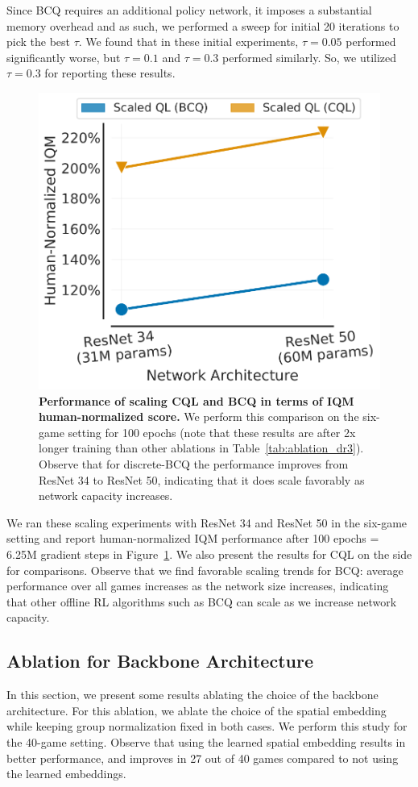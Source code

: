 {Since BCQ requires an additional policy network, it imposes a substantial memory overhead and as such, we performed a sweep for initial 20 iterations to pick the best $\tau$.
We found that in these initial experiments, $\tau=0.05$ performed significantly worse, but $\tau=0.1$ and $\tau=0.3$ performed similarly. So, we utilized $\tau=0.3$ for reporting these results.}

\begin{figure}
    \centering
    \includegraphics[width=0.5\linewidth]{chapters/scaled_ql/appendix_figures/bcq_vs_cql.pdf}
    \caption{\footnotesize{{\textbf{Performance of scaling CQL and BCQ in terms of IQM human-normalized score.} We perform this comparison on the six-game setting for 100 epochs (note that these results are after 2x longer training than other ablations in Table~\ref{tab:ablation_dr3}). Observe that for discrete-BCQ the performance improves from ResNet 34 to ResNet 50, indicating that it does scale favorably as network capacity increases.}}}
    \label{tab:ablation_bcq}
    \vspace{-0.1cm}
\end{figure}


{We ran these scaling experiments with ResNet 34 and ResNet 50 in the six-game setting and report human-normalized IQM performance after 100 epochs = 6.25M gradient steps in Figure~\ref{tab:ablation_bcq}. We also present the results for CQL on the side for comparisons. Observe that we find favorable scaling trends for BCQ: average performance over all games increases as the network size increases, indicating that other offline RL algorithms such as BCQ can scale as we increase network capacity.} 

\vspace{-0.2cm}
\subsection{{{Ablation for Backbone Architecture}}}
\label{app:backbone_ablation}
\vspace{-0.2cm}
{In this section, we present some results ablating the choice of the backbone architecture. For this ablation, we ablate the choice of the spatial embedding while keeping group normalization fixed in both cases. We perform this study for the 40-game setting. Observe that using the learned spatial embedding results in better performance, and improves in 27 out of 40 games compared to not using the learned embeddings.}

